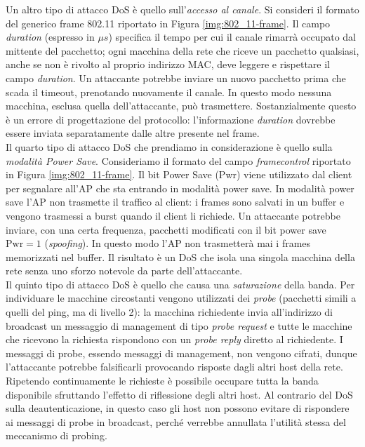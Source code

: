 Un altro tipo di attacco DoS è quello sull'\textit{accesso al canale}. Si consideri il formato del generico frame 802.11 riportato in Figura \ref{img:802_11-frame}. Il campo \textit{duration} (espresso in $\mu s$) specifica il tempo per cui il canale rimarrà occupato dal mittente del pacchetto; ogni macchina della rete che riceve un pacchetto qualsiasi, anche se non è rivolto al proprio indirizzo MAC, deve leggere e rispettare il campo \textit{duration}. Un attaccante potrebbe inviare un nuovo pacchetto prima che scada il timeout, prenotando nuovamente il canale. In questo modo nessuna macchina, esclusa quella dell'attaccante, può trasmettere. Sostanzialmente questo è un errore di progettazione del protocollo: l'informazione \textit{duration} dovrebbe essere inviata separatamente dalle altre presente nel frame.\\
Il quarto tipo di attacco DoS che prendiamo in considerazione è quello sulla \textit{modalità Power Save}. Consideriamo il formato del campo \textit{framecontrol} riportato in Figura \ref{img:802_11-frame}. Il bit Power Save (Pwr) viene utilizzato dal client per segnalare all'AP che sta entrando in modalità power save. In modalità power save l'AP non trasmette il traffico al client: i frames sono salvati in un buffer e vengono trasmessi a burst quando il client li richiede. Un attaccante potrebbe inviare, con una certa frequenza, pacchetti modificati con il bit power save $\text{Pwr} = 1$ (\textit{spoofing}). In questo modo l'AP non trasmetterà mai i frames memorizzati nel buffer. Il risultato è un DoS che isola una singola macchina della rete senza uno sforzo notevole da parte dell'attaccante.\\
Il quinto tipo di attacco DoS è quello che causa una \textit{saturazione} della banda. Per individuare le macchine circostanti vengono utilizzati dei \textit{probe} (pacchetti simili a quelli del ping, ma di livello 2): la macchina richiedente invia all'indirizzo di broadcast un messaggio di management di tipo \textit{probe request} e tutte le macchine che ricevono la richiesta rispondono con un \textit{probe reply} diretto al richiedente. I messaggi di probe, essendo messaggi di management, non vengono cifrati, dunque l'attaccante potrebbe falsificarli provocando risposte dagli altri host della rete. Ripetendo continuamente le richieste è possibile occupare tutta la banda disponibile sfruttando l'effetto di riflessione degli altri host. Al contrario del DoS sulla deautenticazione, in questo caso gli host non possono evitare di rispondere ai messaggi di probe in broadcast, perché verrebbe annullata l'utilità stessa del meccanismo di probing.\\
